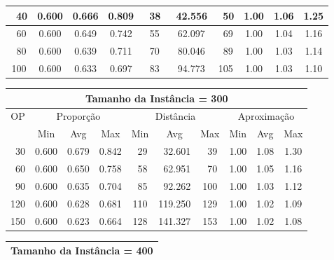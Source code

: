 \begin{table}[htbp]
\begin{center}
{\begin{tabular}{|c|c|c|c|c|c|c|c|c|c|}
~40                 & 0.600     & 0.666    & 0.809    & ~38      & ~42.556  & ~50     & 1.00    & 1.06   & 1.25            \\ \hline
~60                 & 0.600     & 0.649    & 0.742    & ~55      & ~62.097  & ~69     & 1.00    & 1.04   & 1.16            \\ \hline
~80                 & 0.600     & 0.639    & 0.711    & ~70      & ~80.046  & ~89     & 1.00    & 1.03   & 1.14            \\ \hline
100                 & 0.600     & 0.633    & 0.697    & ~83      & ~94.773  & 105     & 1.00    & 1.03   & 1.10            \\ \hline
\end{tabular}%
\vspace{5pt}
\begin{tabular}{|c|c|c|c|c|c|c|c|c|c|}
\hline
\multicolumn{10}{|c|}{\bf Tamanho da Instância = 300}                                                                          \\ \hline
\multirow{2}{*}{OP} & \multicolumn{3}{c|}{Proporção} & \multicolumn{3}{c|}{Distância} & \multicolumn{3}{c|}{Aproximação}   \\ \cline{2-10}
                    & Min       & Avg      & Max      & Min      & Avg      & Max     & Min     & Avg    & Max             \\ \hline
~30                 & 0.600     & 0.679    & 0.842    & ~29      & ~32.601  & ~39     & 1.00    & 1.08   & 1.30            \\ \hline
~60                 & 0.600     & 0.650    & 0.758    & ~58      & ~62.951  & ~70     & 1.00    & 1.05   & 1.16            \\ \hline
~90                 & 0.600     & 0.635    & 0.704    & ~85      & ~92.262  & 100     & 1.00    & 1.03   & 1.12            \\ \hline
120                 & 0.600     & 0.628    & 0.681    & 110      & 119.250  & 129     & 1.00    & 1.02   & 1.09            \\ \hline
150                 & 0.600     & 0.623    & 0.664    & 128      & 141.327  & 153     & 1.00    & 1.02   & 1.08            \\ \hline
\end{tabular}%
\vspace{5pt}
\begin{tabular}{|c|c|c|c|c|c|c|c|c|c|}
\hline
\multicolumn{10}{|c|}{\bf Tamanho da Instância = 400}                                                                          \\ \hline

\end{tabular}}
\end{center}
\end{table}
